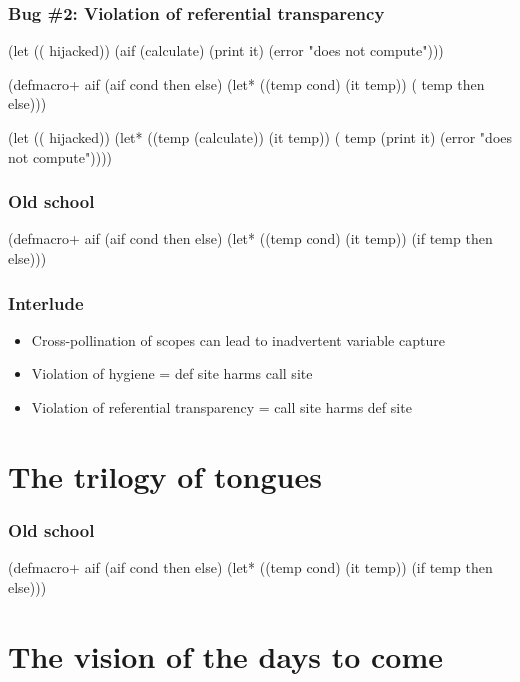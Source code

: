 \documentclass[hyperref={bookmarks=false}]{beamer}
\begin{document}
\begin{frame}[fragile]
\frametitle{Bug \#2: Violation of referential transparency}
\begin{semiverbatim}
(let ((\text{\color{blue}{if}} hijacked))
  (aif (calculate)
    (print it)
    (error "does not compute")))

(defmacro+ aif
  (aif cond then else)
  (let* ((temp cond)
         (it temp))
    (\text{\color{red}{if}} temp then else)))

(let ((\text{\color{blue}{if}} hijacked))
  (let* ((temp (calculate))
         (it temp))
    (\text{\color{blue}{if}} temp
      (print it)
      (error "does not compute"))))
\end{semiverbatim}
\end{frame}

\begin{frame}[fragile]
\frametitle{Old school}
\begin{semiverbatim}
(defmacro+ aif
  (aif cond then else)
    (let* ((temp cond)
           (it temp))
      (if temp then else)))
\end{semiverbatim}

\end{frame}

\begin{frame}[fragile]
\frametitle{Interlude}
\begin{itemize}
\item Cross-pollination of scopes can lead to inadvertent variable capture
\item Violation of hygiene = def site harms call site
\item Violation of referential transparency = call site harms def site
\end{itemize}
\end{frame}

\section{The trilogy of tongues}

\begin{frame}[fragile]
\frametitle{Old school}
\begin{semiverbatim}
(defmacro+ aif
  (aif cond then else)
    (let* ((temp cond)
           (it temp))
      (if temp then else)))
\end{semiverbatim}

\end{frame}

\section{The vision of the days to come}
\end{document}
